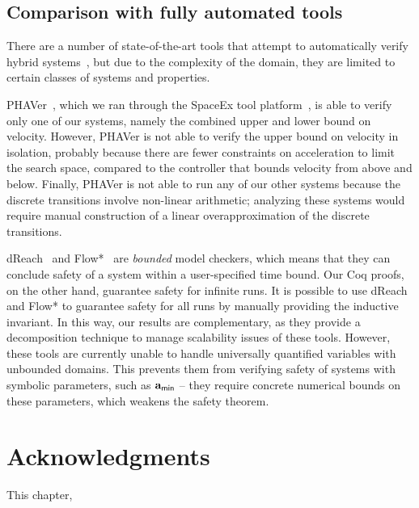 \subsection{Comparison with fully automated tools}
There are a number of state-of-the-art tools that attempt to automatically
verify hybrid
systems~\cite{PHAVerSTTT08,chen2015flow,kong2015dreach,HyTechCAV97}, but
due to the complexity of the domain, they are limited to certain classes of
systems and properties.

PHAVer~\cite{PHAVerSTTT08}, which we ran through the SpaceEx tool
platform~\cite{frehse2011spaceex}, is able to verify only one of our
systems, namely the combined upper and lower bound on velocity.  However,
PHAVer is not able to verify the upper bound on velocity in isolation,
probably because there are fewer constraints on acceleration to limit the
search space, compared to the controller that bounds velocity from above
and below.  Finally, PHAVer is not able to run any of our other systems
because the discrete transitions involve non-linear arithmetic; analyzing
these systems would require manual construction of a linear
overapproximation of the discrete transitions.

dReach~\cite{kong2015dreach} and Flow*~\cite{chen2015flow}
are \emph{bounded} model checkers, which means that they can conclude
safety of a system within a user-specified time bound.  Our Coq proofs, on
the other hand, guarantee safety for infinite runs.  It is possible to use
dReach and Flow* to guarantee safety for all runs by manually providing the
inductive invariant.  In this way, our results are complementary, as they
provide a decomposition technique to manage scalability issues of these
tools.  However, these tools are currently unable to handle universally
quantified variables with unbounded domains.  This prevents them from
verifying safety of systems with symbolic parameters, such as $\mathbf{a}_{\mathsf{min}}$ --
they require concrete numerical bounds on these parameters, which weakens
the safety theorem.

\section{Acknowledgments}
This chapter, \emsoftack{}
